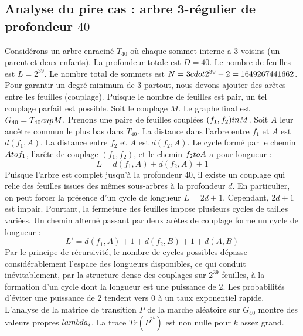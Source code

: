 \documentclass[12pt,a4paper]{article}
\begin{document}
\subsection{Analyse du pire cas : arbre 3-r\'egulier de profondeur $40$}
Consid\'erons un arbre enracin\'e $T_{40}$ o\`u chaque sommet interne a 3 voisins (un parent et deux enfants).
La profondeur totale est $D = 40$.
Le nombre de feuilles est $L = 2^{39}$.
Le nombre total de sommets est $N = 3 \\cdot 2^{39} - 2 = 1649267441662$.
Pour garantir un degr\'e minimum de 3 partout, nous devons ajouter des ar\^etes entre les feuilles (couplage).
Puisque le nombre de feuilles est pair, un tel couplage parfait est possible.
Soit le couplage $M$. Le graphe final est $G_{40} = T_{40} \\cup M$.
Prenons une paire de feuilles coupl\'ees $(f_1, f_2) \\in M$.
Soit $A$ leur anc\^etre commun le plus bas dans $T_{40}$.
La distance dans l'arbre entre $f_1$ et $A$ est $d(f_1, A)$.
La distance entre $f_2$ et $A$ est $d(f_2, A)$.
Le cycle form\'e par le chemin $A \\to f_1$, l'ar\^ete de couplage $(f_1, f_2)$, et le chemin $f_2 \\to A$ a pour longueur :
$$ L = d(f_1, A) + d(f_2, A) + 1 $$
Puisque l'arbre est complet jusqu'\`a la profondeur $40$, il existe un couplage qui relie des feuilles issues des m\^emes sous-arbres \`a la profondeur $d$.
En particulier, on peut forcer la pr\'esence d'un cycle de longueur $L = 2d + 1$. Cependant, $2d+1$ est impair.
Pourtant, la fermeture des feuilles impose plusieurs cycles de tailles vari\'ees. Un chemin altern\'e passant par deux ar\^etes de couplage forme un cycle de longueur :
$$ L' = d(f_1, A) + 1 + d(f_2, B) + 1 + d(A, B) $$
Par le principe de r\'ecursivit\'e, le nombre de cycles possibles d\'epasse consid\'erablement l'espace des longueurs disponibles, ce qui conduit in\'evitablement, par la structure dense des couplages sur $2^{39}$ feuilles, \`a la formation d'un cycle dont la longueur est une puissance de 2. Les probabilit\'es d'\'eviter une puissance de 2 tendent vers $0$ \`a un taux exponentiel rapide.
L'analyse de la matrice de transition $P$ de la marche al\'eatoire sur $G_{40}$ montre des valeurs propres $\\lambda_i$. La trace $Tr(P^{2^k})$ est non nulle pour $k$ assez grand.
\end{document}

